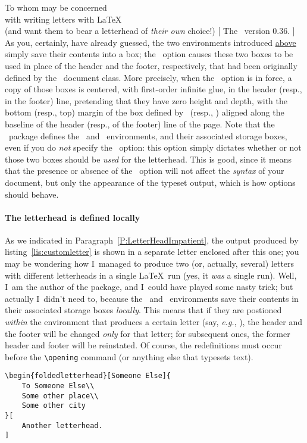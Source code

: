 \begin{letterhead}{
	To whom may be concerned\\
	with writing letters with \LaTeX\\
	(and want them to bear a letterhead
	of \emph{their own} choice!)
}[
	The \Bundle\ version 0.36.
]
As you, certainly, have already guessed, the two environments introduced
\hyperref[P:LetterHeadImpatient]{above} simply save their contents into a box;
the \oclh\ option causes these two boxes to be used in place of the header and
the footer, respectively, that had been originally defined by the \lcdp\
document class.  More precisely, when the \oclh\ option is in force, a copy of
those boxes is centered, with first-order infinite glue, in the header (resp.,
in the footer) line, pretending that they have zero height and depth, with the
bottom (resp., top) margin of the box defined by \eclh\ (resp., \eclf) aligned
along the baseline of the header (resp., of the footer) line of the page.  Note
that the \cdpa\ package defines the \eclh\ and \eclf\ environments, and their
associated storage boxes, even if you do \emph{not} specify the \oclh\ option:
this option simply dictates whether or not those two boxes should be \emph{used}
for the letterhead.  This is good, since it means that the presence or absence
of the \oclh\ option will not affect the \emph{syntax} of your document, but
only the appearance of the typeset output, which is how options should behave.



\paragraph{The letterhead is defined locally}
\label{P:Local}

As we indicated in Paragraph~\ref{P:LetterHeadImpatient}, the output produced by
listing~\ref{lis:customletter} is shown in a separate letter enclosed after this
one; you may be wondering how I~managed to produce two (or, actually, several)
letters with different letterheads in a single \LaTeX\ run (yes, it \emph{was} a
single run).  Well, I~am the author of the package, and I~could have played some
nasty trick; but actually I~didn't need to, because the \eclh\ and \eclf\
environments save their contents in their associated storage boxes
\emph{locally}.  This means that if they are postioned \emph{within} the
environment that produces a certain letter (say, \emph{e.g.},
\env{foldedletterhead}), the header and the footer will be changed \emph{only}
for that letter; for subsequent ones, the former header and footer will be
reinstated.  Of course, the redefinitions must occur before the \verb|\opening|
command (or anything else that typesets text).

\begin{listing}[tbp]
	\cleantop
\begin{verbatim}
\begin{foldedletterhead}[Someone Else]{
    To Someone Else\\
    Some other place\\
    Some other city
}[
    Another letterhead.
]


\end{verbatim}
\end{listing}
\end{letterhead}
